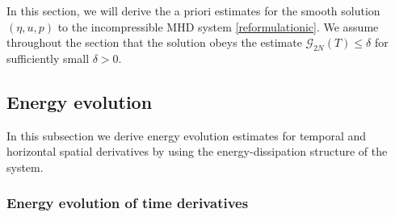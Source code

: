 \documentclass[a4paper,reqno,11pt]{amsart}
\numberwithin{equation}{section}
\begin{document}
In this section, we will derive the a priori estimates for the smooth solution $(\eta,u,p)$ to the incompressible MHD system \eqref{reformulationic}. We assume throughout the section that the solution obeys the estimate $\mathcal{G}_{2N}(T) \le \delta$ for sufficiently small $\delta>0$.

\subsection{Energy evolution}

In this subsection we derive energy evolution estimates for temporal and horizontal spatial derivatives by using the energy-dissipation structure of the system.

\subsubsection{Energy evolution of time derivatives}
\end{document}
